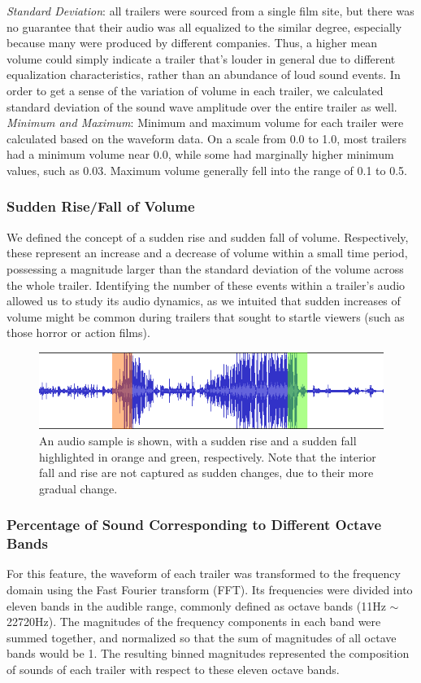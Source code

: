 \documentclass[letterpaper, 10 pt, conference]{ieeeconf}  %
\begin{document}
\textit{Standard Deviation}: all trailers were sourced from a single film site, but there was no guarantee that their audio was all equalized to the similar degree, especially because many were produced by different companies. Thus, a higher mean volume could simply indicate a trailer that's louder in general due to different equalization characteristics, rather than an abundance of loud sound events. In order to get a sense of the variation of volume in each trailer, we calculated standard deviation of the sound wave amplitude over the entire trailer as well.\\

\textit{Minimum and Maximum}: Minimum and maximum volume for each trailer were calculated based on the waveform data. On a scale from 0.0 to 1.0, most trailers had a minimum volume near 0.0, while some had marginally higher minimum values, such as 0.03. Maximum volume generally fell into the range of 0.1 to 0.5.

\subsubsection{Sudden Rise/Fall of Volume}
We defined the concept of a sudden rise and sudden fall of volume. Respectively, these represent an increase and a decrease of volume within a small time period, possessing a magnitude larger than the standard deviation of the volume across the whole trailer. Identifying the number of these events within a trailer's audio allowed us to study its audio dynamics, as we intuited that sudden increases of volume might be common during trailers that sought to startle viewers (such as those horror or action films).

\begin{figure}[h]
	\centering
	\includegraphics[width=\columnwidth]{audio_peaks.png}
	\caption{An audio sample is shown, with a sudden rise and a sudden fall highlighted in orange and green, respectively. Note that the interior fall and rise are not captured as sudden changes, due to their more gradual change.}
	\label{f:audio_peaks}
\end{figure}


\subsubsection{Percentage of Sound Corresponding to Different Octave Bands}
For this feature, the waveform of each trailer was transformed to the frequency domain using the Fast Fourier transform (FFT). Its frequencies were divided into eleven bands in the audible range, commonly defined as octave bands (11Hz $\sim$ 22720Hz). The magnitudes of the frequency components in each band were summed together, and normalized so that the sum of magnitudes of all octave bands would be 1. The resulting binned magnitudes represented the composition of sounds of each trailer with respect to these eleven octave bands. 
\end{document}
